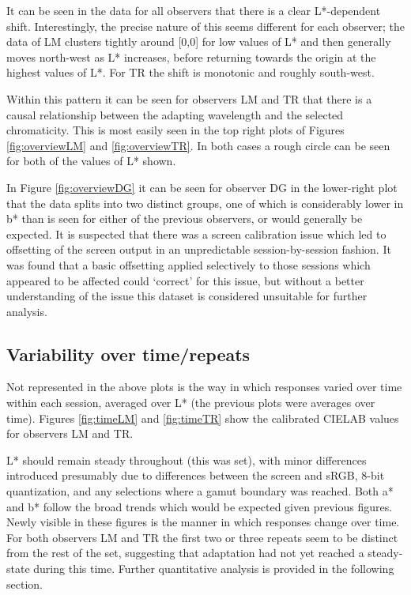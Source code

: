It can be seen in the data for all observers that there is a clear L*-dependent shift. Interestingly, the precise nature of this seems different for each observer; the data of LM clusters tightly around [0,0] for low values of L* and then generally moves north-west as L* increases, before returning towards the origin at the highest values of L*. For TR the shift is monotonic and roughly south-west.

Within this pattern it can be seen for observers LM and TR that there is a causal relationship between the adapting wavelength and the selected chromaticity. This is most easily seen in the top right plots of Figures \ref{fig:overviewLM} and \ref{fig:overviewTR}. In both cases a rough circle can be seen for both of the values of L* shown.

In Figure \ref{fig:overviewDG} it can be seen for observer DG in the lower-right plot that the data splits into two distinct groups, one of which is considerably lower in b* than is seen for either of the previous observers, or would generally be expected. It is suspected that there was a screen calibration issue which led to offsetting of the screen output in an unpredictable session-by-session fashion. It was found that a basic offsetting applied selectively to those sessions which appeared to be affected could `correct' for this issue, but without a better understanding of the issue this dataset is considered unsuitable for further analysis.

\subsection{Variability over time/repeats}

Not represented in the above plots is the way in which responses varied over time within each session, averaged over L* (the previous plots were averages over time). Figures \ref{fig:timeLM} and \ref{fig:timeTR} show the calibrated CIELAB values for observers LM and TR. 

L* should remain steady throughout (this was set), with minor differences introduced presumably due to differences between the screen and sRGB, 8-bit quantization, and any selections where a gamut boundary was reached. Both a* and b* follow the broad trends which would be expected given previous figures. Newly visible in these figures is the manner in which responses change over time. For both observers LM and TR the first two or three repeats seem to be distinct from the rest of the set, suggesting that adaptation had not yet reached a steady-state during this time. Further quantitative analysis is provided in the following section.

